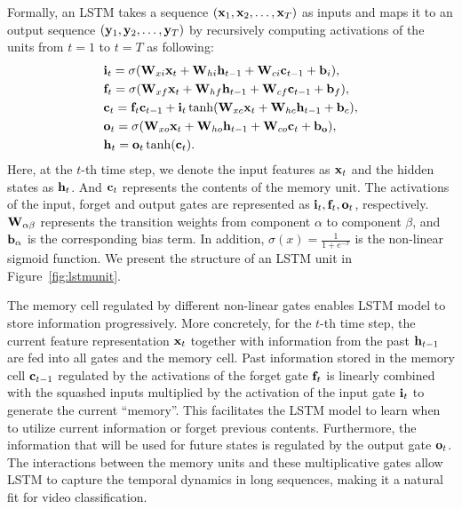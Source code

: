 \documentclass[journal]{IEEEtran}
\begin{document}
Formally, an LSTM takes a sequence $({\bf x}_1,{\bf x}_2,\ldots,{\bf x}_T)$ as inputs and maps it to an output sequence  $({\bf y}_1,{\bf y}_2,\ldots,{\bf y}_T)$ by recursively computing activations of the units from $t=1$ to $t = T$ as following:
\begin{align*} 
& {\bf i}_t=\sigma({\bf W}_{xi}{\bf x}_t+{\bf W}_{hi}{\bf h}_{t-1}+{\bf W}_{ci}{\bf c}_{t-1}+{\bf b}_i), \\ 
& {\bf f}_t=\sigma({\bf W}_{xf}{\bf x}_t+{\bf W}_{hf}{\bf h}_{t-1}+{\bf W}_{cf}{\bf c}_{t-1}+{\bf b}_f), \\
& {\bf c}_t={\bf f}_t{\bf c}_{t-1}+{\bf i}_t\tanh({\bf W}_{xc}{\bf x}_t+{\bf W}_{hc}{\bf h}_{t-1}+{\bf b}_c), \\
& {\bf o}_t=\sigma({\bf W}_{xo}{\bf x}_t+{\bf W}_{ho}{\bf h}_{t-1}+{\bf W}_{co}{\bf c}_{t}+{\bf b_o}), \\
& {\bf h}_t={\bf o}_t\tanh({\bf c}_t).
\end{align*}
Here, at the $t$-th time step, we denote the input features as ${\bf x}_t$ and the hidden states as ${\bf h}_t$. And ${\bf c}_t$ represents the contents of the memory unit. The activations of the input, forget and output gates are represented as ${\bf i}_t, {\bf f}_t, {\bf o}_t$, respectively.
${\bf W}_{\alpha\beta}$ represents the transition weights from component $\alpha$ to component $\beta$, and ${\bf b}_\alpha$ is the corresponding bias term. In addition, $\sigma(x) = \frac{1}{1+e^{-x}}$ is the non-linear sigmoid function. We present the structure of an LSTM unit in Figure~\ref{fig:lstmunit}.

The memory cell regulated by different non-linear gates enables LSTM model to store information progressively. More concretely, for the $t$-th time step, the current feature representation ${\bf x}_t$ together with information from the past ${\bf h}_{t-1}$ are fed into all gates and the memory cell. Past information stored in the memory cell ${\bf c}_{t-1}$ regulated by the activations of the forget gate ${\bf f}_t$ is linearly combined with the squashed inputs multiplied by the activation of the input gate ${\bf i}_t$ to generate the current ``memory''. This facilitates the LSTM model to learn when to utilize current information or forget previous contents. Furthermore, the information that will be used for future states is regulated by the output gate ${\bf o}_t$. The interactions between the memory units and these multiplicative gates allow LSTM to capture
the temporal dynamics in long sequences, making it a natural fit for video classification.
\end{document}
